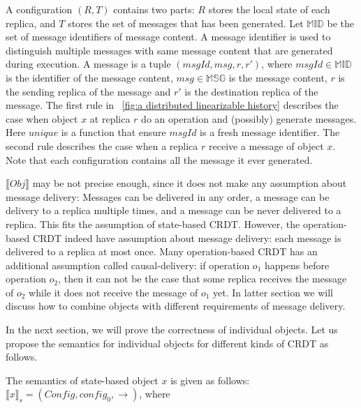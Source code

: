 A configuration $(R,T)$ contains two parts: $R$ stores the local state of each replica, and $T$ stores the set of messages that has been generated. Let $\mathbb{MID}$ be the set of message identifiers of message content. A message identifier is used to distinguish multiple messages with same message content that are generated during execution. A message is a tuple $(\mathit{msgId},\mathit{msg},r,r')$, where $\mathit{msgId} \in \mathbb{MID}$ is the identifier of the message content, $\mathit{msg} \in \mathbb{MSG}$ is the message content, $r$ is the sending replica of the message and $r'$ is the destination replica of the message. The first rule in \figurename~\ref{fig:a distributed linearizable history} describes the case when object $x$ at replica $r$ do an operation and (possibly) generate messages. Here $\mathit{unique}$ is a function that ensure $\mathit{msgId}$ is a fresh message identifier. The second rule describes the case when a replica $r$ receive a message of object $x$. Note that each configuration contains all the message it ever generated.

$\llbracket \mathit{Obj} \rrbracket$ may be not precise enough, since it does not make any assumption about message delivery: Messages can be delivered in any order, a message can be delivery to a replica multiple times, and a message can be never delivered to a replica. This fits the assumption of state-based CRDT. However, the operation-based CRDT indeed have assumption about message delivery: each message is delivered to a replica at most once. Many operation-based CRDT has an additional assumption called causal-delivery: if operation $o_1$ happens before operation $o_2$, then it can not be the case that some replica receives the message of $o_2$ while it does not receive the message of $o_1$ yet. In latter section we will discuss how to combine objects with different requirements of message delivery.

In the next section, we will prove the correctness of individual objects. Let us propose the semantics for individual objects for different kinds of CRDT as follows.

The semantics of state-based object $x$ is given as follows: $\llbracket x \rrbracket_{s} = (\mathit{Config},\mathit{config}_0,\rightarrow)$, where

